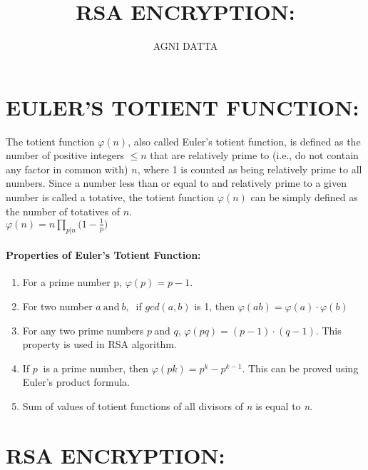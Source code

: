 \documentclass[12pt,fleqn]{article}
\begin{document}
\title{\textbf{\huge{}RSA ENCRYPTION:}}
\author{AGNI DATTA}

\maketitle
\tableofcontents{}

\pagebreak{}

\part{EULER'S TOTIENT FUNCTION:}

\medskip{}

The totient function $\varphi(n)$, also called Euler's totient function,
is defined as the number of positive integers $\leq n$ that are relatively
prime to (i.e., do not contain any factor in common with) $n$, where
1 is counted as being relatively prime to all numbers. Since a number
less than or equal to and relatively prime to a given number is called
a totative, the totient function $\varphi(n)$ can be simply defined
as the number of totatives of $n$.\\

$\displaystyle\varphi(n)=n\prod_{p|n}\bigg(1-\frac{1}{p}\bigg)$
\\

\subsection{Properties of Euler’s Totient Function:}
\begin{enumerate}
\item For a prime number p, $\varphi(p)= p-1$.
\item For two number $a\:\textrm{and}\:b,\:$ if $gcd(a,b)$ is 1, then
$\varphi(ab)=\varphi(a)\cdot\varphi(b)$
\item For any two prime numbers $p\:$and $q$, $\varphi(pq)=(p-1)\cdot(q-1)$.
This property is used in RSA algorithm. 
\item If $p\:$ is a prime number, then $\varphi(pk)=p^k - p^{k-1}$. This
can be proved using Euler’s product formula.
\item Sum of values of totient functions of all divisors of \textit{n} is equal to \textit{n}.
\end{enumerate}
\pagebreak{}

\part{RSA ENCRYPTION:}
\end{document}
